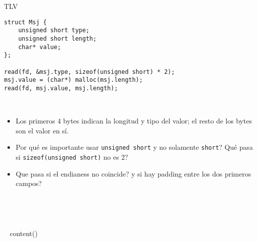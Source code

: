 \begin{frame}[fragile]{TLV}
    \begin{lstlisting}[style=normal]
struct Msj {
    unsigned short type;
    unsigned short length;
    char* value;
};

read(fd, &msj.type, sizeof(unsigned short) * 2);
msj.value = (char*) malloc(msj.length);
read(fd, msj.value, msj.length);
    \end{lstlisting}
~%
    \begin{itemize}
        \item Los primeros 4 bytes indican la longitud y tipo del valor; el resto de los bytes son el valor en s\'i.
        \item Por qu\'e es importante usar \lstinline[style=normal]!unsigned short! y no solamente \lstinline[style=normal]!short!? Qu\'e pasa si \lstinline[style=normal]!sizeof(unsigned short)! no es 2?
        \item Que pasa si el endianess no coincide? y si hay padding entre los dos primeros campos?
    \end{itemize}
~%
\end{frame}


~%

~{ content() }~


